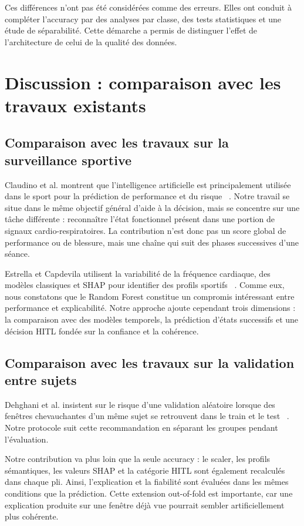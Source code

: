 \documentclass[12pt,a4paper]{article}
\begin{document}
Ces différences n'ont pas été considérées comme des erreurs. Elles ont conduit
à compléter l'accuracy par des analyses par classe, des tests statistiques et
une étude de séparabilité. Cette démarche a permis de distinguer l'effet de
l'architecture de celui de la qualité des données.



\section{Discussion : comparaison avec les travaux existants}
\label{sec:discussion}

\subsection{Comparaison avec les travaux sur la surveillance sportive}

Claudino et al. montrent que l'intelligence artificielle est principalement
utilisée dans le sport pour la prédiction de performance et du risque
~\cite{claudino2019}. Notre travail se situe dans le même objectif général
d'aide à la décision, mais se concentre sur une tâche différente : reconnaître
l'état fonctionnel présent dans une portion de signaux cardio-respiratoires.
La contribution n'est donc pas un score global de performance ou de blessure,
mais une chaîne qui suit des phases successives d'une séance.

Estrella et Capdevila utilisent la variabilité de la fréquence cardiaque, des
modèles classiques et SHAP pour identifier des profils sportifs
~\cite{estrella2025}. Comme eux, nous constatons que le Random Forest constitue
un compromis intéressant entre performance et explicabilité. Notre approche
ajoute cependant trois dimensions : la comparaison avec des modèles
temporels, la prédiction d'états successifs et une décision HITL fondée sur la
confiance et la cohérence.

\subsection{Comparaison avec les travaux sur la validation entre sujets}

Dehghani et al. insistent sur le risque d'une validation aléatoire lorsque des
fenêtres chevauchantes d'un même sujet se retrouvent dans le train et le test
~\cite{dehghani2019}. Notre protocole suit cette recommandation en séparant les
groupes pendant l'évaluation.

Notre contribution va plus loin que la seule accuracy : le scaler, les
profils sémantiques, les valeurs SHAP et la catégorie HITL sont également
recalculés dans chaque pli. Ainsi, l'explication et la fiabilité sont évaluées
dans les mêmes conditions que la prédiction. Cette extension out-of-fold est
importante, car une explication produite sur une fenêtre déjà vue pourrait
sembler artificiellement plus cohérente.
\end{document}
